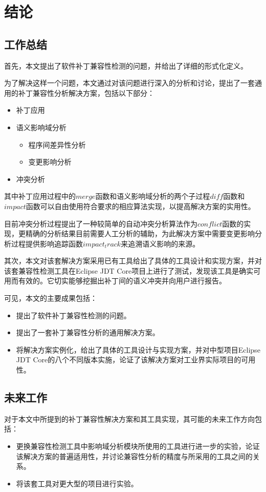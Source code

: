 \chapter{结论}
\section{工作总结}

首先，本文提出了软件补丁兼容性检测的问题，并给出了详细的形式化定义。

为了解决这样一个问题，本文通过对该问题进行深入的分析和讨论，提出了一套通用的补丁兼容性分析解决方案，包括以下部分：
\begin{itemize}
	\item 补丁应用
	\item 语义影响域分析
	\begin{itemize}
		\item 程序间差异性分析
		\item 变更影响分析
	\end{itemize}
	\item 冲突分析
\end{itemize}

其中补丁应用过程中的$merge$函数和语义影响域分析的两个子过程$diff$函数和$impact$函数可以自由使用符合要求的相应算法实现，以提高解决方案的实用性。

目前冲突分析过程提出了一种较简单的自动冲突分析算法作为$conflict$函数的实现，更精确的分析结果目前需要人工分析的辅助，为此解决方案中需要变更影响分析过程提供影响追踪函数$impact_track$来追溯语义影响的来源。

其次，本文对该套解决方案采用已有工具给出了具体的工具设计和实现方案，并对该套兼容性检测工具在Eclipse JDT Core项目上进行了测试，发现该工具是确实可用而有效的。它切实能够挖掘出补丁间的语义冲突并向用户进行报告。

可见，本文的主要成果包括：
\begin{itemize}
	\item 提出了软件补丁兼容性检测的问题。
	\item 提出了一套补丁兼容性分析的通用解决方案。
	\item 将解决方案实例化，给出了具体的工具设计与实现方案，并对中型项目Eclipse JDT Core的八个不同版本实施，论证了该解决方案对工业界实际项目的可用性。
\end{itemize}

\section{未来工作}

对于本文中所提到的补丁兼容性解决方案和其工具实现，其可能的未来工作方向包括：
\begin{itemize}
	\item 更换兼容性检测工具中影响域分析模块所使用的工具进行进一步的实验，论证该解决方案的普遍适用性，并讨论兼容性分析的精度与所采用的工具之间的关系。
	\item 将该套工具对更大型的项目进行实验。
\end{itemize}